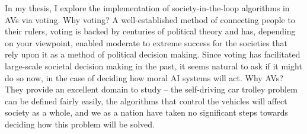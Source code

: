 In my thesis, I explore the implementation of society-in-the-loop algorithms in AVs via voting. Why voting? A well-established method of connecting people to their rulers, voting is backed by centuries of political theory and has, depending on your viewpoint, enabled moderate to extreme success for the societies that rely upon it as a method of political decision making. Since voting has facilitated large-scale societal decision making in the past, it seems natural to ask if it might do so now, in the case of deciding how moral AI systems will act. Why AVs? They provide an excellent domain to study -- the self-driving car trolley problem can be defined fairly easily, the algorithms that control the vehicles will affect society as a whole, and we as a nation have taken no significant steps towards deciding how this problem will be solved.
\begin{comment}

There are many ethical and moral issues associated with programming self driving cars to make moral decisions, the obvious one being ``what decisions should they make when''? However, there are also some non-obvious yet non-trivial ethical issues here.

\begin{itemize}
\item Who gets to program the cars? Is it an individual, a private company, a government?
\item It is well-known that algorithms can exhibit biases (for example, racial). Should/how will algorithms account for this bias?
\item What degree of ownership will society have over the programs/decision-making algorithms in these cars? 
\item Should people have a right to voice their inputs for self-driving car (and other moral AI) programs? Should these programs be designed by researchers/governments to maximize social utility, or, should people be able to``vote'' on the moral preferences?
\end{itemize}
One way to implement a moral AI would be to try to somehow abstract or understand moral features/principles, and build an algorithm that uses this information to reason morally. For instance, you might survey people on which moral features they feel indicate whether a decision is right or wrong, and then build an algorithm that, using those features, makes decisions given new inputs. There are some potential problems with this approach:

\begin{itemize}
\item Voter/citizen distrust -- people are less likely to support/adopt a system they do not understand (think: machines taking over the world), and a system that abstracts moral values may be harder to understand.


\end{comment}
